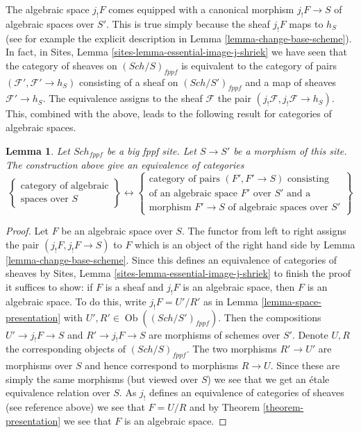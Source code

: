 \documentclass{stacks-project}
\theoremstyle{plain}
\newtheorem{lemma}[subsection]{Lemma}
\theoremstyle{definition}
\theoremstyle{remark}
\numberwithin{equation}{subsection}
\def\Sch{\mathit{Sch}}
\def\Ob{\mathop{\mathrm{Ob}}\nolimits}
\begin{document}
\noindent
The algebraic space $j_!F$ comes equipped with a canonical morphism
$j_!F \to S$ of algebraic spaces over $S'$. This is true simply
because the sheaf $j_!F$ maps to $h_S$ (see for example the
explicit description in
Lemma \ref{lemma-change-base-scheme}).
In fact, in
Sites, Lemma \ref{sites-lemma-essential-image-j-shriek}
we have seen that the category of sheaves on $(\Sch/S)_{fppf}$
is equivalent to the category of pairs $(\mathcal{F}', \mathcal{F}' \to h_S)$
consisting of a sheaf on $(\Sch/S')_{fppf}$ and a map of sheaves
$\mathcal{F}' \to h_S$. The equivalence assigns to the sheaf $\mathcal{F}$
the pair $(j_!\mathcal{F}, j_!\mathcal{F} \to h_S)$.
This, combined with the above, leads to the following
result for categories of algebraic spaces.

\begin{lemma}
\label{lemma-category-of-spaces-over-smaller-base-scheme}
Let $\Sch_{fppf}$ be a big fppf site.
Let $S \to S'$ be a morphism of this site.
The construction above give an equivalence of
categories
$$
\left\{
\begin{matrix}
\text{category of algebraic}\\
\text{spaces over }S
\end{matrix}
\right\}
\leftrightarrow
\left\{
\begin{matrix}
\text{category of pairs }(F', F' \to S)\text{ consisting}\\
\text{of an algebraic space }F'\text{ over }S'\text{ and a}\\
\text{morphism }F' \to S\text{ of algebraic spaces over }S'
\end{matrix}
\right\}
$$
\end{lemma}

\begin{proof}
Let $F$ be an algebraic space over $S$. The functor from left to right
assigns the pair $(j_!F, j_!F \to S)$ to $F$
which is an object of the right hand side by
Lemma \ref{lemma-change-base-scheme}.
Since this defines an equivalence of categories of sheaves by
Sites, Lemma \ref{sites-lemma-essential-image-j-shriek}
to finish the proof it suffices to show:
if $F$ is a sheaf and $j_!F$ is an algebraic space, then $F$
is an algebraic space. To do this, write
$j_!F = U'/R'$ as in
Lemma \ref{lemma-space-presentation}
with $U', R' \in \Ob((\Sch/S')_{fppf})$.
Then the compositions $U' \to j_!F \to S$ and $R' \to j_!F \to S$
are morphisms of schemes over $S'$. Denote $U, R$ the corresponding
objects of $(\Sch/S)_{fppf}$. The two morphisms
$R' \to U'$ are morphisms over $S$ and hence correspond to
morphisms $R \to U$. Since these are simply the same
morphisms (but viewed over $S$) we see that we get an \'etale
equivalence relation over $S$. As $j_!$ defines an equivalence of
categories of sheaves (see reference above) we see that
$F = U/R$ and by
Theorem \ref{theorem-presentation}
we see that $F$ is an algebraic space.
\end{proof}
\end{document}
